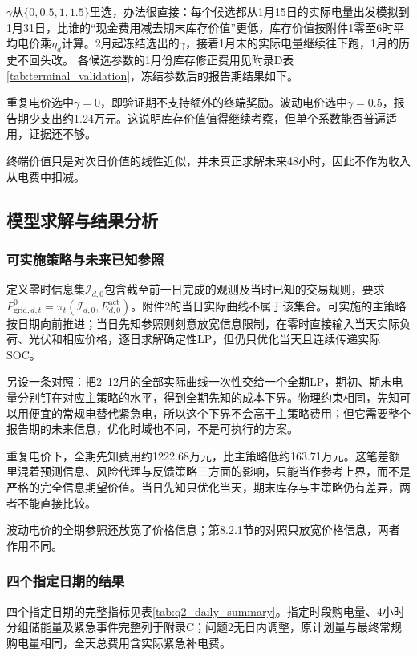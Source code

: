 \documentclass[UTF8,fontset=none,a4paper,zihao=-4]{ctexart}
\begin{document}
\(\gamma\)从\(\{0,0.5,1,1.5\}\)里选，办法很直接：每个候选都从1月15日的实际电量出发模拟到1月31日，比谁的“现金费用减去期末库存价值”更低，库存价值按附件1零至6时平均电价乘\(\eta_d\)计算。2月起冻结选出的\(\gamma\)，接着1月末的实际电量继续往下跑，1月的历史不回头改。
各候选参数的1月份库存修正费用见附录D表\ref{tab:terminal_validation}，冻结参数后的报告期结果如下。



重复电价选中\(\gamma=0\)，即验证期不支持额外的终端奖励。波动电价选中\(\gamma=0.5\)，报告期少支出约1.24万元。这说明库存价值值得继续考察，但单个系数能否普遍适用，证据还不够。

终端价值只是对次日价值的线性近似，并未真正求解未来48小时，因此不作为收入从电费中扣减。

\subsection{模型求解与结果分析}
\subsubsection{可实施策略与未来已知参照}
定义零时信息集\(\mathcal I_{d,0}\)包含截至前一日完成的观测及当时已知的交易规则，要求\(P_{\mathrm{grid},d,t}^{0}=\pi_t(\mathcal I_{d,0},E_{d,0}^{\mathrm{act}})\)。附件2的当日实际曲线不属于该集合。可实施的主策略按日期向前推进；当日先知参照则刻意放宽信息限制，在零时直接输入当天实际负荷、光伏和相应价格，逐日求解确定性LP，但仍只优化当天且连续传递实际SOC。

另设一条对照：把2--12月的全部实际曲线一次性交给一个全期LP，期初、期末电量分别钉在对应主策略的水平，得到全期先知的成本下界。物理约束相同，先知可以用便宜的常规电替代紧急电，所以这个下界不会高于主策略费用；但它需要整个报告期的未来信息，优化时域也不同，不是可执行的方案。


重复电价下，全期先知费用约1222.68万元，比主策略低约163.71万元。这笔差额里混着预测信息、风险代理与反馈策略三方面的影响，只能当作参考上界，而不是严格的完全信息期望价值。当日先知只优化当天，期末库存与主策略仍有差异，两者不能直接比较。

波动电价的全期参照还放宽了价格信息；第8.2.1节的对照只放宽价格信息，两者作用不同。

\subsubsection{四个指定日期的结果}
四个指定日期的完整指标见表\ref{tab:q2_daily_summary}。指定时段购电量、4小时分组储能量及紧急事件完整列于附录C；问题2无日内调整，原计划量与最终常规购电量相同，全天总费用含实际紧急补电费。

\end{document}
